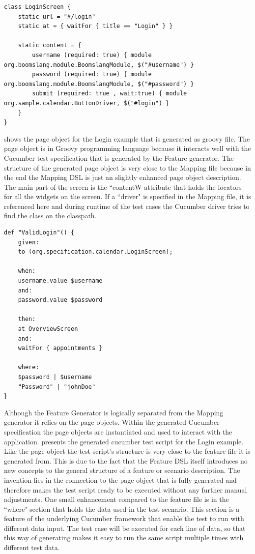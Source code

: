 \documentclass{sig-alternate-05-2015}
\begin{document}
\begin{lstlisting}[captionpos=b, caption=Generated Page Object, label={lst:MappingGenerated}, language=dsl]
class LoginScreen {
	static url = "#/login"
	static at = { waitFor { title == "Login" } }
	
	static content = {
		username (required: true) { module org.boomslang.module.BoomslangModule, $("#username") }
		password (required: true) { module org.boomslang.module.BoomslangModule, $("#password") }
		submit (required: true , wait:true) { module org.sample.calendar.ButtonDriver, $("#login") }
	}
}
\end{lstlisting}

 shows the page object for the Login example that is generated as groovy file.
The page object is in Groovy programming language because it interacts well with the Cucumber test specification that is generated by the Feature generator.
The structure of the generated page object is very close to the Mapping file because in the end the Mapping DSL is just an slightly enhanced page object description.
The main part of the screen is the ``contentW attribute that holds the locators for all the widgets on the screen.
If a ``driver" is specified in the Mapping file, it is referenced here and during runtime of the test cases the Cucumber driver tries to find the class on the classpath.

\begin{lstlisting}[captionpos=b, caption=Generated Feature File, label={lst:featureGenerated}, language=dsl]
	def "ValidLogin"() {
	given:
	to (org.specification.calendar.LoginScreen);
	
	when:
	username.value $username
	and:
	password.value $password
	
	then:
	at OverviewScreen
	and:
	waitFor { appointments }
	
	where:
	$password | $username
	"Password" | "johnDoe"
}
\end{lstlisting}
Although the Feature Generator is logically separated from the Mapping generator it relies on the page objects.
Within the generated Cucumber specification the page objects are instantiated and used to interact with the application.
 presents the generated cucumber test script for the Login example. 
Like the page object the test script's structure is very close to the feature file it is generated from.
This is due to the fact that the Feature DSL itself introduces no new concepts to the general structure of a feature or scenario description.
The invention lies in the connection to the page object that is fully generated and therefore makes the test script ready to be executed without any further manual adjustments.
One small enhancement compared to the feature file is in the ``where" section that holds the data used in the test scenario.
This section is a feature of the underlying Cucumber framework that enable the test to run with different data input. 
The test case will be executed for each line of data, so that this way of generating makes it easy to run the same script multiple times with different test data.
\end{document}
